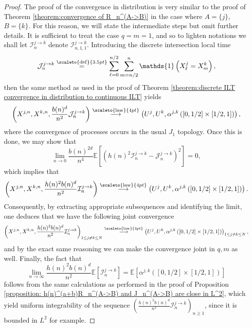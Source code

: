 \documentclass[12pt]{article}
\newcommand{\I}{\mathcal I}
\newcommand{\J}{\mathcal J}
\newcommand{\EE}{\mathbb E}
\newcommand{\1}{\mathds{1}}
\newcommand{\distribution}{\stackrel{\scaleto{\mathrm{law}}{4pt}}{\longrightarrow}}
\newcommand{\eqdef}{\stackrel{\scaleto{\mathrm{def}}{3.5pt}}{=}}
\numberwithin{equation}{section}
\begin{document}
\begin{proof}
    The proof of the convergence in distribution is very similar to the proof of Theorem \ref{theorem:convergence of R_n^(A->B)} in the case where $A=\{j\}$, $B=\{k\}$. For this reason, we will state the intermediate steps but omit further details. It is sufficient to treat the case $q=m=1$, and so to lighten notations we shall let $\I_n^{j\rightarrow k}$ denote $\I_{n,1,1}^{j\rightarrow k}$. Introducing the discrete intersection local time
    \begin{equation*}
        \J_{n}^{j\rightarrow k}\eqdef\sum_{\ell=0}^{n/2}\sum_{m=n/2}^n\1\left(X_\ell^j=X_m^k\right),
    \end{equation*}
    then the same method as used in the proof of Theorem \ref{theorem:discrete ILT convergence in distribution to continuous ILT} yields
    \begin{equation*}
        \left(X^{j,n},X^{k,n},\frac{b(n)^d}{n^2}\J_n^{j\rightarrow k}\right)\distribution\left(U^j,U^k,\alpha^{j,k}\left(\left[0,1/2\right]\times\left[1/2,1\right]\right)\right),
    \end{equation*}
    where the convergence of processes occurs in the usual $J_1$ topology. Once this is done, we may show that
    \begin{equation*}
        \underset{n\rightarrow 0}\lim\frac{b(n)^{2d}}{n^4}\EE\left[\left(h(n)^2\I_n^{j\rightarrow k}-\J_n^{j\rightarrow k}\right)^2\right]=0,
    \end{equation*}
    which implies that 
    \begin{equation*}
        \left(X^{j,n},X^{k,n},\frac{h(n)^2b(n)^d}{n^2}\I_n^{j\rightarrow k}\right)\distribution\left(U^j,U^k,\alpha^{j,k}\left(\left[0,1/2\right]\times\left[1/2,1\right]\right)\right).
    \end{equation*}
    Consequently, by extracting appropriate subsequences and identifying the limit, one deduces that we have the following joint convergence
    \begin{equation*}
        \left(X^{j,n},X^{k,n},\frac{h(n)^2b(n)^d}{n^2}\I_n^{j\rightarrow k}\right)_{1\le j\ne k\le N}\distribution\left(U^j,U^k,\alpha^{j,k}\left(\left[0,1/2\right]\times\left[1/2,1\right]\right)\right)_{1\le j\ne k\le N},
    \end{equation*}
    and by the exact same reasoning we can make the convergence joint in $q,m$ as well. Finally, the fact that 
    \begin{equation*}
        \underset{n\rightarrow\infty}\lim\frac{h(n)^2b(n)^{d}}{n^2}\EE\left[\I_n^{j\rightarrow k}\right]=\EE\left[\alpha^{j,k}\left(\left[0,1/2\right]\times\left[1/2,1\right]\right)\right]
    \end{equation*}
    follows from the same calculations as performed in the proof of Proposition \ref{proposition: h(n)^(a+b)R_n^(A->B) and J_n^(A->B) are close in L^2}, which yield uniform integrability of the sequence $\left(\frac{h(n)^2b(n)^d}{n^2}\I_n^{j\rightarrow k}\right)_{n\ge1}$, since it is bounded in $L^2$ for example.
\end{proof}
\end{document}
